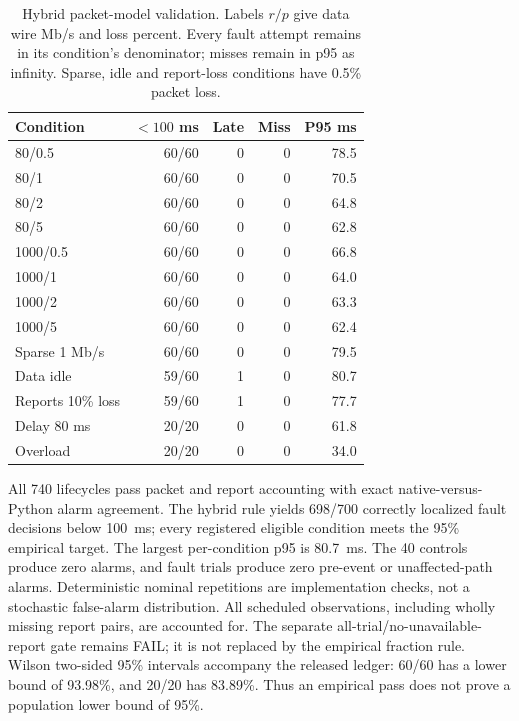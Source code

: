 \documentclass[sigconf]{acmart}
\begin{document}
\begin{table}[t]
\caption{Hybrid packet-model validation. Labels $r/p$ give data wire
Mb/s and loss percent. Every fault attempt remains in its condition's
denominator; misses remain in p95 as infinity. Sparse, idle and report-loss
conditions have 0.5\% packet loss.}
\label{tab:hybrid-validation}
\centering
\small
\setlength{\tabcolsep}{3pt}
\begin{tabular}{@{}lrrrr@{}}
\toprule
Condition & $<100$ ms & Late & Miss & P95 ms \\
\midrule
80/0.5 & 60/60 & 0 & 0 & 78.5 \\
80/1 & 60/60 & 0 & 0 & 70.5 \\
80/2 & 60/60 & 0 & 0 & 64.8 \\
80/5 & 60/60 & 0 & 0 & 62.8 \\
1000/0.5 & 60/60 & 0 & 0 & 66.8 \\
1000/1 & 60/60 & 0 & 0 & 64.0 \\
1000/2 & 60/60 & 0 & 0 & 63.3 \\
1000/5 & 60/60 & 0 & 0 & 62.4 \\
Sparse 1 Mb/s & 60/60 & 0 & 0 & 79.5 \\
Data idle & 59/60 & 1 & 0 & 80.7 \\
Reports 10\% loss & 59/60 & 1 & 0 & 77.7 \\
Delay 80 ms & 20/20 & 0 & 0 & 61.8 \\
Overload & 20/20 & 0 & 0 & 34.0 \\
\bottomrule
\end{tabular}
\end{table}

All 740 lifecycles pass packet and report accounting with exact
native-versus-Python alarm agreement. The hybrid rule yields
698/700 correctly localized fault decisions
below 100~ms; every registered eligible condition meets the 95\%
empirical target. The largest per-condition p95 is 80.7~ms.
The 40 controls produce zero alarms, and fault trials produce zero
pre-event or unaffected-path alarms. Deterministic nominal repetitions
are implementation checks, not a stochastic false-alarm distribution.
All scheduled observations, including wholly missing report pairs, are
accounted for. The separate all-trial/no-unavailable-report gate remains
FAIL; it is not replaced by the empirical fraction rule.
Wilson two-sided 95\% intervals accompany the released ledger:
60/60 has a lower bound of 93.98\%, and 20/20 has 83.89\%.
Thus an empirical pass does not prove a population lower bound of 95\%.
\end{document}
